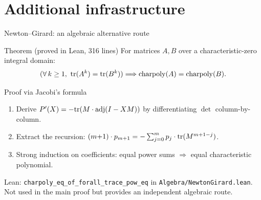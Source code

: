 \documentclass[aspectratio=169,10pt]{beamer}
\begin{document}
\section{Additional infrastructure}

\begin{frame}{Newton--Girard: an algebraic alternative route}
    \vspace{-0.6em}

    \begin{block}{Theorem (proved in Lean, 316 lines)}
        For matrices $A, B$ over a characteristic-zero integral domain:
        \[
            (\forall\, k\ge 1,\  \mathrm{tr}(A^k)=\mathrm{tr}(B^k))
            \Longrightarrow
            \mathrm{charpoly}(A) = \mathrm{charpoly}(B).
        \]
    \end{block}

    \begin{block}{Proof via Jacobi's formula}
        \begin{enumerate}\itemsep0.1em
            \item Derive $P'(X) = -\mathrm{tr}(M\cdot\mathrm{adj}(I-XM))$
                  by differentiating $\det$ column-by-column.
            \item Extract the recursion: $(m{+}1)\cdot p_{m+1} = -\sum_{j=0}^m p_j\cdot\mathrm{tr}(M^{m+1-j})$.
            \item Strong induction on coefficients: equal power sums $\Rightarrow$
                  equal characteristic polynomial.
        \end{enumerate}
    \end{block}

    \textcolor{dimwhite}{\footnotesize Lean: \texttt{charpoly\_eq\_of\_forall\_trace\_pow\_eq} in \texttt{Algebra/NewtonGirard.lean}.
        Not used in the main proof but provides an independent algebraic route.}
\end{frame}
\end{document}
